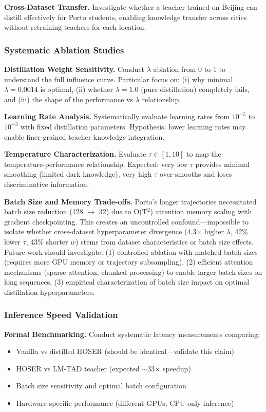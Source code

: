 \textbf{Cross-Dataset Transfer.} Investigate whether a teacher trained on Beijing can distill effectively for Porto students, enabling knowledge transfer across cities without retraining teachers for each location.

\subsubsection{Systematic Ablation Studies}

\textbf{Distillation Weight Sensitivity.} Conduct $\lambda$ ablation from 0 to 1 to understand the full influence curve. Particular focus on: (i) why minimal $\lambda = 0.0014$ is optimal, (ii) whether $\lambda = 1.0$ (pure distillation) completely fails, and (iii) the shape of the performance vs $\lambda$ relationship.

\textbf{Learning Rate Analysis.} Systematically evaluate learning rates from $10^{-5}$ to $10^{-3}$ with fixed distillation parameters. Hypothesis: lower learning rates may enable finer-grained teacher knowledge integration.

\textbf{Temperature Characterization.} Evaluate $\tau \in [1, 10]$ to map the temperature-performance relationship. Expected: very low $\tau$ provides minimal smoothing (limited dark knowledge), very high $\tau$ over-smooths and loses discriminative information.

\textbf{Batch Size and Memory Trade-offs.} Porto's longer trajectories necessitated batch size reduction (128 $\to$ 32) due to O(T$^2$) attention memory scaling with gradient checkpointing. This creates an uncontrolled confound---impossible to isolate whether cross-dataset hyperparameter divergence (4.3$\times$ higher $\lambda$, 42\% lower $\tau$, 43\% shorter $w$) stems from dataset characteristics or batch size effects. Future work should investigate: (1) controlled ablation with matched batch sizes (requires more GPU memory or trajectory subsampling), (2) efficient attention mechanisms (sparse attention, chunked processing) to enable larger batch sizes on long sequences, (3) empirical characterization of batch size impact on optimal distillation hyperparameters.

\subsubsection{Inference Speed Validation}

\textbf{Formal Benchmarking.} Conduct systematic latency measurements comparing:
\begin{itemize}[noitemsep,topsep=0pt]
    \item Vanilla vs distilled HOSER (should be identical—validate this claim)
    \item HOSER vs LM-TAD teacher (expected $\sim$33$\times$ speedup)
    \item Batch size sensitivity and optimal batch configuration
    \item Hardware-specific performance (different GPUs, CPU-only inference)
\end{itemize}


